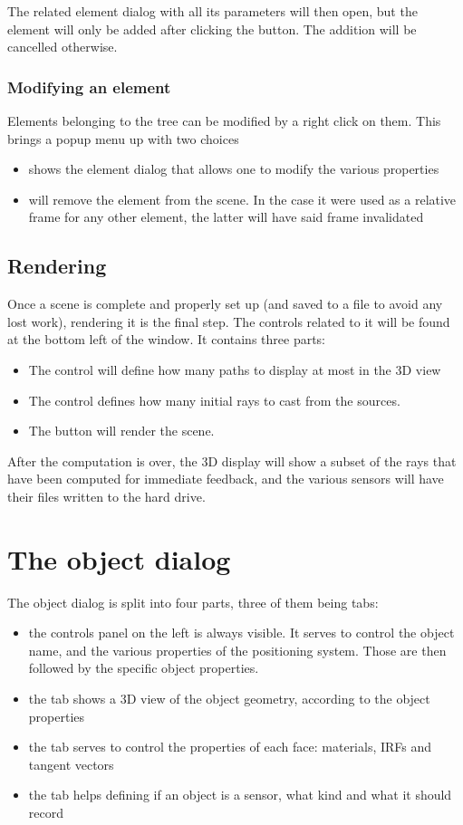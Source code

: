 The related element dialog with all its parameters will then open, but the element will only be added after clicking the  button. The addition will be cancelled otherwise.

\subsubsection{Modifying an element}

Elements belonging to the tree can be modified by a right click on them. This brings a popup menu up with two choices
\begin{itemize}
	\item {} shows the element dialog that allows one to modify the various properties
	\item {} will remove the element from the scene. In the case it were used as a relative frame for any other element, the latter will have said frame invalidated
\end{itemize}

\subsection{Rendering}

Once a scene is complete and properly set up (and saved to a file to avoid any lost work), rendering it is the final step. The controls related to it will be found at the bottom left of the window. It contains three parts:
\begin{itemize}
	\item The  control will define how many paths to display at most in the 3D view
	\item The  control defines how many initial rays to cast from the sources.
	\item The  button will render the scene.
\end{itemize}
After the computation is over, the 3D display will show a subset of the rays that have been computed for immediate feedback, and the various sensors will have their files written to the hard drive.

\section{The object dialog}

The object dialog is split into four parts, three of them being tabs:
\begin{itemize}
	\item the controls panel on the left is always visible. It serves to control the object name, and the various properties of the positioning system. Those are then followed by the specific object properties.
	\item the  tab shows a 3D view of the object geometry, according to the object properties
	\item the  tab serves to control the properties of each face: materials, IRFs and tangent vectors
	\item the  tab helps defining if an object is a sensor, what kind and what it should record
\end{itemize}

